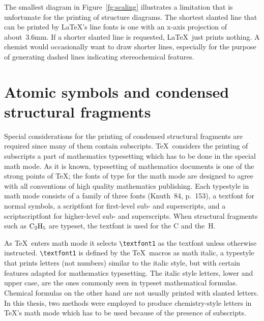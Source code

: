  The smallest diagram in Figure~\ref{fg:scaling}
 illustrates a limitation that
 is unfortunate for the printing of structure diagrams. The shortest
 slanted line that can be printed by \LaTeX's line fonts is
 one with an x-axis projection of about~3.6mm.
 If a shorter slanted line is requested, \LaTeX\  just prints
 nothing. A chemist would occasionally want to draw shorter lines,
 especially for the purpose of generating dashed lines indicating
 stereochemical features.
 
\section{Atomic symbols and condensed structural fragments}
\label{sc:fragments}
 Special considerations for the printing of condensed structural
 fragments are required since many of them contain subscripts.
 \TeX\  considers the printing of subscripts a part of mathematics
 typesetting which has to be done in the special math mode.
 As it is known, typesetting of mathematics
 documents is one of the strong points of \TeX; the fonts of type
 for the math mode are designed to agree with all conventions
 of high quality mathematics publishing. Each typestyle in math
 mode consists of a family of three fonts (Knuth~84, p.~153),
 a textfont for normal symbols, a scriptfont for first-level
 sub- and superscripts, and a scriptscriptfont for higher-level
 sub- and superscripts. When structural fragments such as
 ${\rm C_{2}H_{5}}$ are typeset, the textfont is used
 for the C and the~H.
 
 As \TeX\  enters math mode it selects \verb+\textfont1+ as the textfont
 unless otherwise instructed.
 \verb+\textfont1+ is defined by the \TeX\
 macros as math italic, a typestyle that prints letters (not
 numbers) similar to the italic style, but with certain
 features adapted for mathematics typesetting. The italic
 style letters, lower and upper case, are the ones commonly
 seen in typeset mathematical formulas. Chemical formulas
 on the other hand are not usually printed with slanted
 letters. In this thesis, two methods were employed
 to produce chemistry-style letters in \TeX's math mode which
 has to be used because of the presence of subscripts.
 
